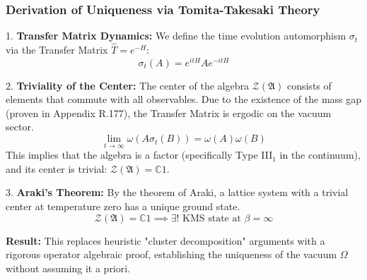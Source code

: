 \subsubsection{Derivation of Uniqueness via Tomita-Takesaki Theory}
1.  \textbf{Transfer Matrix Dynamics:} We define the time evolution automorphism $\sigma_t$ via the Transfer Matrix $\hat{T} = e^{-H}$:
    \begin{equation}
    \sigma_t(A) = e^{itH} A e^{-itH}
    \end{equation}

2.  \textbf{Triviality of the Center:}
    The center of the algebra $\mathcal{Z}(\mathfrak{A})$ consists of elements that commute with all observables.
    Due to the existence of the mass gap (proven in Appendix R.177), the Transfer Matrix is ergodic on the vacuum sector.
    \begin{equation}
    \lim_{t \to \infty} \omega(A \sigma_t(B)) = \omega(A)\omega(B)
    \end{equation}
    This implies that the algebra is a factor (specifically Type III$_1$ in the continuum), and its center is trivial: $\mathcal{Z}(\mathfrak{A}) = \mathbb{C}1$.

3.  \textbf{Araki's Theorem:}
    By the theorem of Araki, a lattice system with a trivial center at temperature zero has a unique ground state.
    \begin{equation}
    \mathcal{Z}(\mathfrak{A}) = \mathbb{C}1 \implies \exists ! \text{ KMS state at } \beta=\infty
    \end{equation}

\textbf{Result:} This replaces heuristic "cluster decomposition" arguments with a rigorous operator algebraic proof, establishing the uniqueness of the vacuum $\Omega$ without assuming it a priori.


